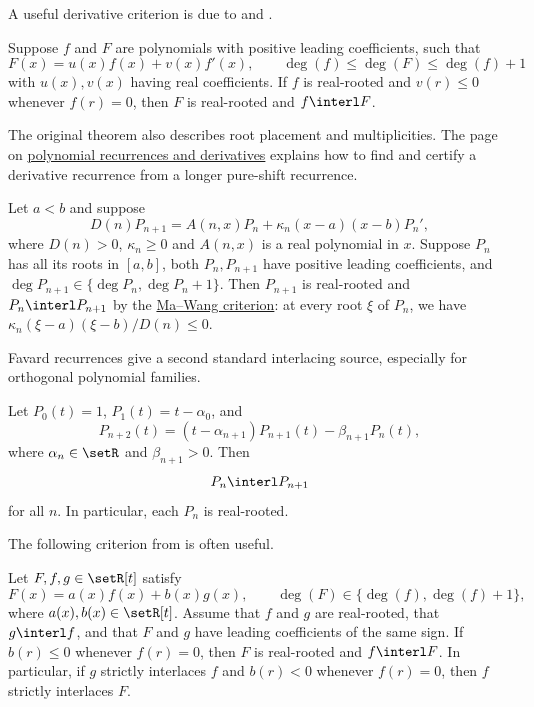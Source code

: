 A useful derivative criterion is due to  and
 \cite[Thm.~2]{MaWang2008}.
\begin{theorem}[Ma--Wang, 2008]
\label{maWangDerivativeCriterion}
Suppose $f$ and $F$ are polynomials with positive leading coefficients,
such that
\[
 F(x) = u(x) f(x) + v(x) f'(x), \qquad  \deg(f) \leq \deg(F) \leq \deg(f) + 1
 \]
with $u(x),v(x)$ having real coefficients.
If $f$ is real-rooted and $v(r) \leq 0$ whenever $f(r)=0$,
then $F$ is real-rooted and $f \interl F$.
\end{theorem}
The original theorem also describes root placement and multiplicities.
The page on \hyperref[polynomialRecurrences]{polynomial recurrences and derivatives}
explains how to find and certify a derivative recurrence from a longer
pure-shift recurrence.


\begin{example}
\label{interlacingDerivativeInterval}
Let $a<b$ and suppose
\[
 D(n)P_{n+1}=A(n,x)P_n+\kappa_n(x-a)(x-b)P_n',
\]
where $D(n)>0$, $\kappa_n\geq0$ and $A(n,x)$ is a real polynomial in $x$.
Suppose $P_n$ has all its roots in $[a,b]$, both $P_n,P_{n+1}$ have positive
leading coefficients, and $\deg P_{n+1}\in\{\deg P_n,\deg P_n+1\}$.
Then $P_{n+1}$ is real-rooted and $P_n\interl P_{n+1}$ by the
\hyperref[maWangDerivativeCriterion]{Ma--Wang criterion}: at every root
$\xi$ of $P_n$, we have $\kappa_n(\xi-a)(\xi-b)/D(n)\leq0$.
\end{example}

Favard recurrences give a second standard interlacing source, especially for
orthogonal polynomial families.
\begin{theorem}
\label{favardInterlacing}
Let \(P_0(t)=1\), \(P_1(t)=t-\alpha_0\), and
\[
  P_{n+2}(t)=(t-\alpha_{n+1})P_{n+1}(t)-\beta_{n+1}P_n(t),
\]
where \(\alpha_n\in\setR\) and \(\beta_{n+1}>0\).  Then
\[
  P_n \interl P_{n+1}
\]
for all \(n\).  In particular, each \(P_n\) is real-rooted.
\end{theorem}


The following criterion from \cite[Thm.~2.1]{LiuWang2007} is often useful.
\begin{theorem}
Let $F,f,g \in \setR[t]$ satisfy
\[
 F(x) = a(x)f(x) + b(x)g(x), \qquad \deg(F) \in \{\deg(f), \deg(f)+1\},
\]
where $a(x),b(x) \in \setR[t]$.
Assume that $f$ and $g$ are real-rooted, that $g \interl f$, and that
$F$ and $g$ have leading coefficients of the same sign.
If $b(r) \leq 0$ whenever $f(r)=0$, then $F$ is real-rooted and $f \interl F$.
In particular, if $g$ strictly interlaces $f$ and
$b(r) \lt 0$ whenever $f(r)=0$, then $f$ strictly interlaces $F$.
\end{theorem}


